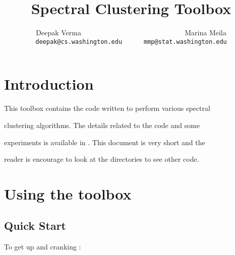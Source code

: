 \documentclass[10pt]{article}
\begin{document}
\title{Spectral Clustering Toolbox}

\author{Deepak Verma ~~~~~~~~~~~~~~~~~~~~~~~~~~~~ Marina Meila \\\texttt{deepak@cs.washington.edu~~~~~~mmp@stat.washington.edu}}

\maketitle





\section{Introduction}

\label{sec:intro}



This toolbox contains the code written to perform various spectral

clustering algorithms. The details related to the code and some

experiments is available in \cite{VM03}. This document is very short and the

reader is encourage to look at the directories to see other code.  



\section{Using the toolbox}

\subsection{Quick Start}

\label{sec:quick}





To get up and cranking : 
\end{document}
